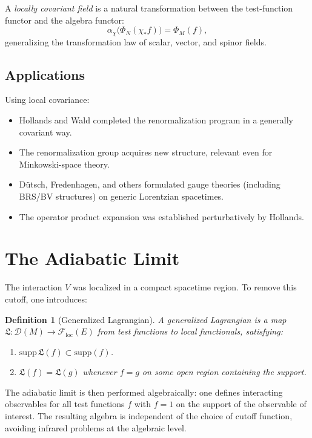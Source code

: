 \documentclass[11pt,a4paper]{article}
\newtheorem{definition}{Definition}[section]
\begin{document}
A \emph{locally covariant field} is a natural transformation between
the test-function functor and the algebra functor:
\[
  \alpha_\chi\bigl(\Phi_N(\chi_* f)\bigr) = \Phi_M(f),
\]
generalizing the transformation law of scalar, vector, and spinor fields.

\subsection{Applications}

Using local covariance:
\begin{itemize}[nosep]
  \item Hollands and Wald completed the renormalization program in a
        generally covariant way.
  \item The renormalization group acquires new structure, relevant even
        for Minkowski-space theory.
  \item D\"utsch, Fredenhagen, and others formulated gauge theories
        (including BRS/BV structures) on generic Lorentzian spacetimes.
  \item The operator product expansion was established perturbatively
        by Hollands.
\end{itemize}

\section{The Adiabatic Limit}

The interaction $V$ was localized in a compact spacetime region. To
remove this cutoff, one introduces:

\begin{definition}[Generalized Lagrangian]
A generalized Lagrangian is a map $\mathfrak{L}: \mathcal{D}(M) \to \mathcal{F}_{\mathrm{loc}}(E)$
from test functions to local functionals, satisfying:
\begin{enumerate}[nosep]
  \item $\mathrm{supp}\,\mathfrak{L}(f) \subset \mathrm{supp}(f)$.
  \item $\mathfrak{L}(f) = \mathfrak{L}(g)$ whenever $f = g$ on some
        open region containing the support.
\end{enumerate}
\end{definition}

The adiabatic limit is then performed algebraically: one defines
interacting observables for all test functions $f$ with $f=1$ on the
support of the observable of interest. The resulting algebra is
independent of the choice of cutoff function, avoiding infrared problems
at the algebraic level.
\end{document}
